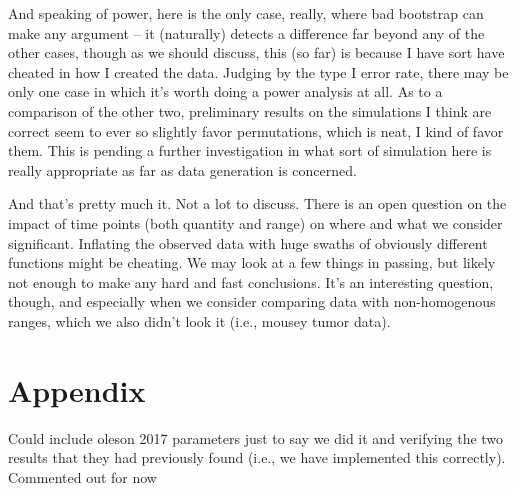 \documentclass{article}
\begin{document}
And speaking of power, here is the only case, really, where bad bootstrap can make any argument -- it (naturally) detects a difference far beyond any of the other cases, though as we should discuss, this (so far) is because I have sort have cheated in how I created the data. Judging by the type I error rate, there may be only one case in which it's worth doing a power analysis at all. As to a comparison of the other two, preliminary results on the simulations I think are correct seem to ever so slightly favor permutations, which is neat, I kind of favor them. This is pending a further investigation in what sort of simulation here is really appropriate as far as data generation is concerned.

And that's pretty much it. Not a lot to discuss. There is an open question on the impact of time points (both quantity and range) on where and what we consider significant. Inflating the observed data with huge swaths of obviously different functions might be cheating. We may look at a few things in passing, but likely not enough to make any hard and fast conclusions. It's an interesting question, though, and especially when we consider comparing data with non-homogenous ranges, which we also didn't look it (i.e., mousey tumor data). 





\section*{Appendix}

Could include oleson 2017 parameters just to say we did it and verifying the two results that they had previously found (i.e., we have implemented this correctly). Commented out for now
\end{document}
